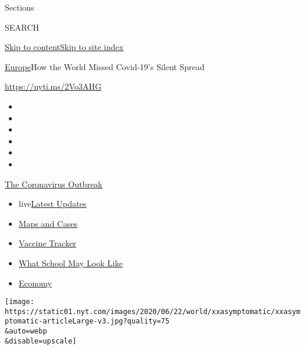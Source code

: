 Sections

SEARCH

\protect\hyperlink{site-content}{Skip to
content}\protect\hyperlink{site-index}{Skip to site index}

\href{/section/world/europe}{Europe}\textbar{}How the World Missed
Covid-19's Silent Spread

\url{https://nyti.ms/2Vo3AHG}

\begin{itemize}
\item
\item
\item
\item
\item
\item
\end{itemize}

\href{https://www.nytimes.com/news-event/coronavirus?action=click\&pgtype=Article\&state=default\&region=TOP_BANNER\&context=storylines_menu}{The
Coronavirus Outbreak}

\begin{itemize}
\tightlist
\item
  live\href{https://www.nytimes.com/2020/08/01/world/coronavirus-covid-19.html?action=click\&pgtype=Article\&state=default\&region=TOP_BANNER\&context=storylines_menu}{Latest
  Updates}
\item
  \href{https://www.nytimes.com/interactive/2020/us/coronavirus-us-cases.html?action=click\&pgtype=Article\&state=default\&region=TOP_BANNER\&context=storylines_menu}{Maps
  and Cases}
\item
  \href{https://www.nytimes.com/interactive/2020/science/coronavirus-vaccine-tracker.html?action=click\&pgtype=Article\&state=default\&region=TOP_BANNER\&context=storylines_menu}{Vaccine
  Tracker}
\item
  \href{https://www.nytimes.com/interactive/2020/07/29/us/schools-reopening-coronavirus.html?action=click\&pgtype=Article\&state=default\&region=TOP_BANNER\&context=storylines_menu}{What
  School May Look Like}
\item
  \href{https://www.nytimes.com/live/2020/07/31/business/stock-market-today-coronavirus?action=click\&pgtype=Article\&state=default\&region=TOP_BANNER\&context=storylines_menu}{Economy}
\end{itemize}

\texttt{[image: https://static01.nyt.com/images/2020/06/22/world/xxasymptomatic/xxasymptomatic-articleLarge-v3.jpg?quality=75\\\&auto=webp\\\&disable=upscale]}


